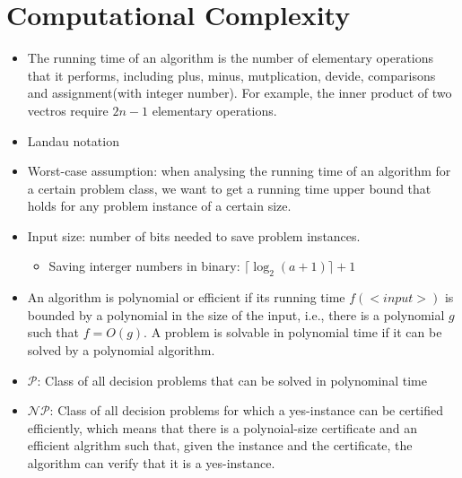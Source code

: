 \documentclass{article}
\begin{document}
\section{Computational Complexity}
\begin{itemize}
\item The running time of an algorithm is the number of elementary operations that it performs, including plus, minus, mutplication, devide, comparisons and assignment(with integer number). For example, the inner product of two vectros require $2n-1$ elementary operations.
\item Landau notation
\item Worst-case assumption: when analysing the running time of an algorithm for a certain problem class, we want to get a running time upper bound that holds for any problem instance of a certain size.
\item Input size: number of bits needed to save problem instances.
\begin{itemize}
\item Saving interger numbers in binary: $\lceil \log_2(a+1)\rceil+1$
\end{itemize}
\item An algorithm is polynomial or efficient if its running time $f(<input>)$ is bounded by a polynomial in the size of the input, i.e., there is a polynomial $g$ such that $f=O(g)$. A problem is solvable in polynomial time if it can be solved by a polynomial algorithm.
\item $\mathcal{P}$: Class of all decision problems that can be solved in polynominal time
\item $\mathcal{NP}$: Class of all decision problems for which a yes-instance can be certified efficiently, which means that there is a polynoial-size certificate and an efficient algrithm such that, given the instance and the certificate, the algorithm can verify that it is a yes-instance.
\end{itemize}
\end{document}
